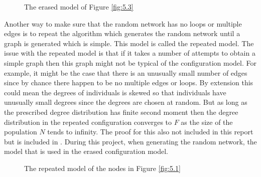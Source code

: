 \documentclass{uonmathsreport}
\begin{document}
\begin{figure}
\begin{center}
\end{center}
\caption{The erased model of Figure \ref{fig:5.3}}
\label{fig:erased}
\end{figure}

Another way to make sure that the random network has no loops or multiple edges is to repeat the algorithm which generates the random network until a graph is generated which is simple. This model is called the repeated model. The issue with the repeated model is that if it takes a number of attempts to obtain a simple graph then this graph might not be typical of the configuration model. For example, it might be the case that there is an unusually small number of edges since by chance there happen to be no multiple edges or loops. By extension this could mean the degrees of individuals is skewed so that individuals have unusually small degrees since the degrees are chosen at random. But as long as the prescribed degree distribution has finite second moment then the degree distribution in the repeated configuration converges to $F$ as the size of the population $N$ tends to infinity. The proof for this also not included in this report but is included in \cite{bibbritton}. During this project, when generating the random network, the model that is used in the erased configuration model.

\begin{figure}
\begin{center}
\end{center}
\caption{The repeated model of the nodes in Figure \ref{fig:5.1}}
\label{fig:repeated}
\end{figure}
\end{document}
